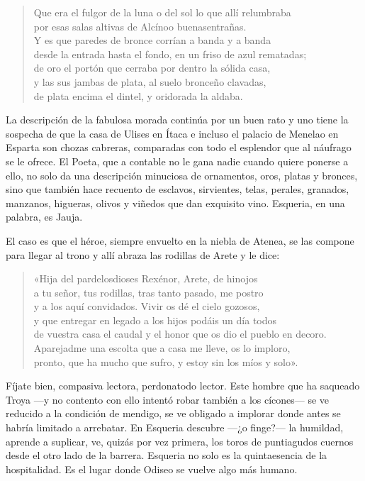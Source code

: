 \begin{verse}
Que era el fulgor de la luna o del sol lo que allí relumbraba\\
por esas salas altivas de Alcínoo buenasentrañas.\\
Y es que paredes de bronce corrían a banda y a banda\\
desde la entrada hasta el fondo, en un friso de azul rematadas;\\
de oro el portón que cerraba por dentro la sólida casa,\\
y las sus jambas de plata, al suelo bronceño clavadas,\\
de plata encima el dintel, y oridorada la aldaba.
\end{verse}

La descripción de la fabulosa morada continúa por un buen rato y uno tiene la sospecha de que la casa de Ulises en Ítaca e incluso el palacio de Menelao en Esparta son chozas cabreras, comparadas con todo el esplendor que al náufrago se le ofrece. El Poeta, que a contable no le gana nadie cuando quiere ponerse a ello, no solo da una descripción minuciosa de ornamentos, oros, platas y bronces, sino que también hace recuento de esclavos, sirvientes, telas, perales, granados, manzanos, higueras, olivos y viñedos que dan exquisito vino. Esqueria, en una palabra, es Jauja.

El caso es que el héroe, siempre envuelto en la niebla de Atenea, se las compone para llegar al trono y allí abraza las rodillas de Arete y le dice:

\begin{verse}
«Hija del pardelosdioses Rexénor, Arete, de hinojos\\
a tu señor, tus rodillas, tras tanto pasado, me postro\\
y a los aquí convidados. Vivir os dé el cielo gozosos,\\
y que entregar en legado a los hijos podáis un día todos\\
de vuestra casa el caudal y el honor que os dio el pueblo en decoro.\\
Aparejadme una escolta que a casa me lleve, os lo imploro,\\
pronto, que ha mucho que sufro, y estoy sin los míos y solo».
\end{verse}

Fíjate bien, compasiva lectora, perdonatodo lector. Este hombre que ha saqueado Troya ---y no contento con ello intentó robar también a los cícones--- se ve reducido a la condición de mendigo, se ve obligado a implorar donde antes se habría limitado a arrebatar. En Esqueria descubre ---¿o finge?--- la humildad, aprende a suplicar, ve, quizás por vez primera, los toros de puntiagudos cuernos desde el otro lado de la barrera. Esqueria no solo es la quintaesencia de la hospitalidad. Es el lugar donde Odiseo se vuelve algo más humano.

